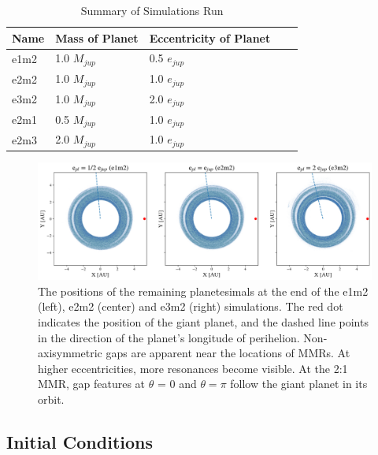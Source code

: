 \documentclass[fleqn,usenatbib]{mnras}
\begin{document}
\begin{table}
\begin{center}
\caption{Summary of Simulations Run}
\begin{tabular}{lllll} \hline \hline
Name     & Mass of Planet & Eccentricity of Planet &  &  \\ \hline
e1m2 & 1.0 $M_{jup}$                     & 0.5 $e_{jup}$                            &  &  \\
e2m2      & 1.0 $M_{jup}$                     & 1.0 $e_{jup}$                             &  &  \\
e3m2 & 1.0 $M_{jup}$                     & 2.0 $e_{jup}$                             &  &  \\
e2m1 & 0.5 $M_{jup}$                   & 1.0 $e_{jup}$                             &  &  \\
e2m3 & 2.0 $M_{jup}$                     & 1.0 $e_{jup}$                             &  &  \\ \hline
\end{tabular}
\label{tab:sims}
\end{center}
\end{table}

\begin{figure}
\begin{center}
    \includegraphics[width=\textwidth]{figures/xy.png}
    \caption{The positions of the remaining planetesimals at the end of the e1m2 (left), e2m2 (center) and e3m2 (right) simulations. The red dot 
    indicates the position of the giant planet, and the dashed line points in the direction of the planet's longitude of perihelion. Non-axisymmetric gaps 
    are apparent near the locations of MMRs. At higher eccentricities, more resonances become visible. At the 2:1 MMR, gap features at $\theta$ = 0 
    and $\theta = \pi$ follow the giant planet in its orbit.\label{fig:xy}}
\end{center}
\end{figure}

\subsection{Initial Conditions}\label{sec:ics}
\end{document}
